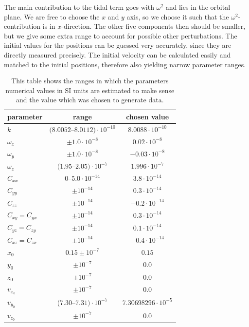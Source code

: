 \documentclass[onecolumn]{aa} %
\begin{document}
The main contribution to the tidal term goes with $\omega^2$ and lies in the orbital plane. We are free to choose the $x$ and $y$ axis, so we choose it such that the $\omega^2$-contribution is in $x$-direction. The other five components then should be smaller, but we give some extra range to account for possible other perturbations.
The initial values for the positions can be guessed very accurately, since they are directly measured precisely. The initial velocity can be calculated easily and matched to the initial positions, therefore also yielding narrow parameter ranges.

\begin{table}%
	\centering
	\caption{This table shows the ranges in which the parameters numerical values in SI units are estimated to make sense and the value which was chosen to generate data.}
		\begin{tabular}{l c c}
			parameter & range & chosen value \\
			\hline	%
			$k$ & $(8.0052$--$8.0112) \cdot 10^{-10}$ & $8.0088 \cdot 10^{-10}$ \\
			$\omega_x$ & $\pm 1.0 \cdot 10^{-8}$ & $0.02 \cdot 10^{-8}$ \\
			$\omega_y$ & $\pm 1.0 \cdot 10^{-8}$ & $-0.03 \cdot 10^{-8}$ \\
			$\omega_z$ & $(1.95$--$2.05) \cdot 10^{-7}$ & $1.996 \cdot 10^{-7}$ \\
			$C_{xx}$ & $0$--$5.0 \cdot 10^{-14}$ & $3.8 \cdot 10^{-14}$ \\
			$C_{yy}$ & $\pm 10^{-14}$ & $0.3 \cdot 10^{-14}$ \\
			$C_{zz}$ & $\pm 10^{-14}$ & $-0.2 \cdot 10^{-14}$ \\
			$C_{xy} = C_{yx}$ & $\pm 10^{-14}$ & $0.3 \cdot 10^{-14}$ \\
			$C_{yz} = C_{zy}$ & $\pm 10^{-14}$ & $0.1 \cdot 10^{-14}$ \\
			$C_{xz} = C_{zx}$ & $\pm 10^{-14}$ & $-0.4 \cdot 10^{-14}$ \\
			$x_0$ & $0.15 \pm 10^{-7}$ & $0.15$ \\
			$y_0$ & $\pm 10^{-7}$ & $0.0$ \\ 
			$z_0$ & $\pm 10^{-7}$ & $0.0$ \\ 
			$v_{x_0}$ & $\pm 10^{-7}$ & $0.0$ \\ 
			$v_{y_0}$ & ($7.30$--$7.31) \cdot 10^{-7}$ & $7.30698296 \cdot 10^{-5}$ \\
			$v_{z_0}$ & $\pm 10^{-7}$ & $0.0$ \\
		\end{tabular}
	\label{tab:parameters}
\end{table}
\end{document}
